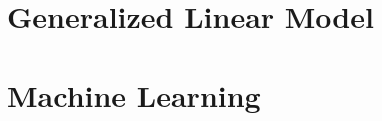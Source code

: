 \documentclass[pad,12pt,mtpro2]{elegantbook}
\begin{document}
\part{Generalized Linear Model}




\part{Machine Learning}




\appendix
\end{document}
